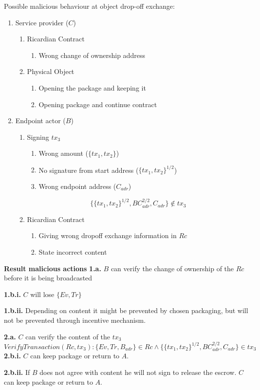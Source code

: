 Possible malicious behaviour at object drop-off exchange:
\begin{enumerate}
  \item Service provider ($C$)
  \begin{enumerate}
    \item Ricardian Contract
    \begin{enumerate}
      \item Wrong change of ownership address
    \end{enumerate}
    \item Physical Object
    \begin{enumerate}
      \item Opening the package and keeping it
      \item Opening package and continue contract
    \end{enumerate}
  \end{enumerate}
  \item Endpoint actor ($B$)
  \begin{enumerate}
    \item Signing $tx_3$
    \begin{enumerate}
      \item Wrong amount ($\{tx_1, tx_2\}$)
      \item No signature from start address ($\{tx_1, tx_2\}^{1/2}$)
      \item Wrong endpoint address ($C_{adr}$)
    \end{enumerate}
    \[\{\{tx_1, tx_2\}^{1/2}, BC_{adr}^{2/2}, C_{adr}\}\not\in tx_3\]
    \item Ricardian Contract
    \begin{enumerate}
      \item Giving wrong dropoff exchange information in $Rc$
      \item State incorrect content
    \end{enumerate}
  \end{enumerate}
\end{enumerate}

\bigbreak
\noindent\textbf{Result malicious actions}
\bigbreak
\noindent\textbf{1.a.} $B$ can verify the change of ownership of the $Rc$ before it is being broadcasted \par
\noindent\textbf{1.b.i.} $C$ will lose $\{Ev, Tr\}$ \par
\noindent\textbf{1.b.ii.} Depending on content it might be prevented by chosen packaging, but will not be prevented through incentive mechanism. \par

\noindent\textbf{2.a.} $C$ can verify the content of the $tx_3$
\[VerifyTransaction(Rc, tx_3)\colon\{Ev, Tr, B_{adr}\} \in Rc \land \{\{tx_1, tx_2\}^{1/2}, BC_{adr}^{2/2}, C_{adr}\} \in tx_3\]
\noindent\textbf{2.b.i.} $C$ can keep package or return to $A$.\par
\noindent\textbf{2.b.ii.} If $B$ does not agree with content he will not sign to release the escrow. $C$ can keep package or return to $A$.\par

